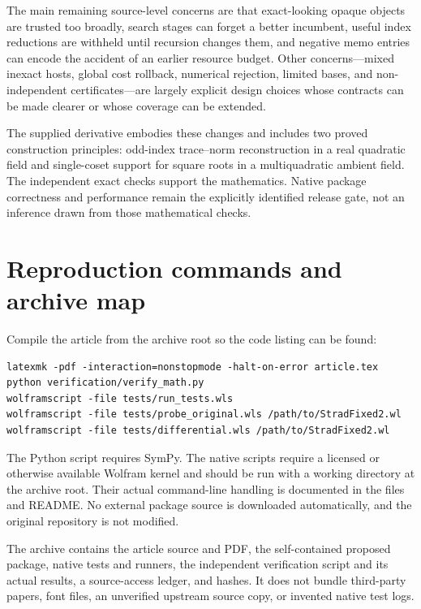 \documentclass[11pt,letterpaper]{article}
\numberwithin{equation}{section}
\theoremstyle{definition}\newtheorem{definition}[theorem]{Definition}
\theoremstyle{remark}\newtheorem{remark}[theorem]{Remark}
\begin{document}
The main remaining source-level concerns are that exact-looking opaque objects are trusted too broadly, search stages can forget a better incumbent, useful index reductions are withheld until recursion changes them, and negative memo entries can encode the accident of an earlier resource budget. Other concerns---mixed inexact hosts, global cost rollback, numerical rejection, limited bases, and non-independent certificates---are largely explicit design choices whose contracts can be made clearer or whose coverage can be extended.

The supplied derivative embodies these changes and includes two proved construction principles: odd-index trace--norm reconstruction in a real quadratic field and single-coset support for square roots in a multiquadratic ambient field. The independent exact checks support the mathematics. Native package correctness and performance remain the explicitly identified release gate, not an inference drawn from those mathematical checks.

\appendix
\section{Reproduction commands and archive map}
Compile the article from the archive root so the code listing can be found:
\begin{lstlisting}[language={}]
latexmk -pdf -interaction=nonstopmode -halt-on-error article.tex
python verification/verify_math.py
wolframscript -file tests/run_tests.wls
wolframscript -file tests/probe_original.wls /path/to/StradFixed2.wl
wolframscript -file tests/differential.wls /path/to/StradFixed2.wl
\end{lstlisting}
The Python script requires SymPy. The native scripts require a licensed or otherwise available Wolfram kernel and should be run with a working directory at the archive root. Their actual command-line handling is documented in the files and README. No external package source is downloaded automatically, and the original repository is not modified.

The archive contains the article source and PDF, the self-contained proposed package, native tests and runners, the independent verification script and its actual results, a source-access ledger, and hashes. It does not bundle third-party papers, font files, an unverified upstream source copy, or invented native test logs.
\end{document}
